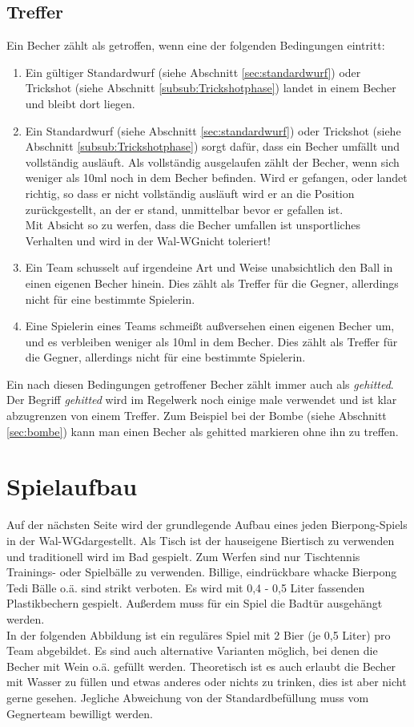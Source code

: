 \documentclass[a5paper, 12pt]{book}
\begin{document}
\section{Treffer}\label{sec:treffer}
Ein Becher zählt als getroffen, wenn eine der folgenden Bedingungen eintritt:
\begin{enumerate} [(1)]
    \item Ein gültiger Standardwurf (siehe Abschnitt \ref{sec:standardwurf}) oder Trickshot (siehe Abschnitt \ref{subsub:Trickshotphase}) landet in einem Becher und bleibt dort liegen.\\
    \item Ein Standardwurf (siehe Abschnitt \ref{sec:standardwurf}) oder Trickshot (siehe Abschnitt \ref{subsub:Trickshotphase}) sorgt dafür, dass ein Becher umfällt und vollständig ausläuft. Als vollständig ausgelaufen zählt der Becher, wenn sich weniger als 10ml noch in dem Becher befinden. Wird er gefangen, oder landet richtig, so dass er nicht vollständig ausläuft wird er an die Position zurückgestellt, an der er stand, unmittelbar bevor er gefallen ist. \\
Mit Absicht so zu werfen, dass die Becher umfallen ist unsportliches Verhalten und wird in der Wal-WG\texttrademark nicht toleriert!
\item Ein Team schusselt auf irgendeine Art und Weise unabsichtlich den Ball in einen eigenen Becher hinein. Dies zählt als Treffer für die Gegner, allerdings nicht für eine bestimmte Spielerin.

\item  Eine Spielerin eines Teams schmeißt außversehen einen eigenen Becher um, und es verbleiben weniger als 10ml in dem Becher. Dies zählt als Treffer für die Gegner, allerdings nicht für eine bestimmte Spielerin. 
\end{enumerate}
Ein nach diesen Bedingungen getroffener Becher zählt immer auch als \textit{gehitted}. Der Begriff \textit{gehitted} wird im Regelwerk noch einige male verwendet und ist klar abzugrenzen von einem Treffer. Zum Beispiel bei der Bombe (siehe Abschnitt \ref{sec:bombe}) kann man einen Becher als gehitted markieren ohne ihn zu treffen. 
\chapter{Spielaufbau} \label{chap:spielaufbau}
Auf der nächsten Seite wird der grundlegende Aufbau eines jeden Bierpong-Spiels in der Wal-WG\texttrademark dargestellt. Als Tisch ist der hauseigene Biertisch zu verwenden und traditionell wird im Bad gespielt. Zum Werfen sind nur Tischtennis Trainings- oder Spielbälle zu verwenden. Billige, eindrückbare whacke Bierpong Tedi Bälle o.ä. sind strikt verboten. Es wird mit 0,4 - 0,5 Liter fassenden Plastikbechern gespielt. Außerdem muss für ein Spiel die Badtür ausgehängt werden. \\
In der folgenden Abbildung ist ein reguläres Spiel mit 2 Bier (je 0,5 Liter) pro Team abgebildet. Es sind auch alternative Varianten möglich, bei denen die Becher mit Wein o.ä. gefüllt werden. Theoretisch ist es auch erlaubt die Becher mit Wasser zu füllen und etwas anderes oder nichts zu trinken, dies ist aber nicht gerne gesehen. Jegliche Abweichung von der Standardbefüllung muss vom Gegnerteam bewilligt werden.
\end{document}
